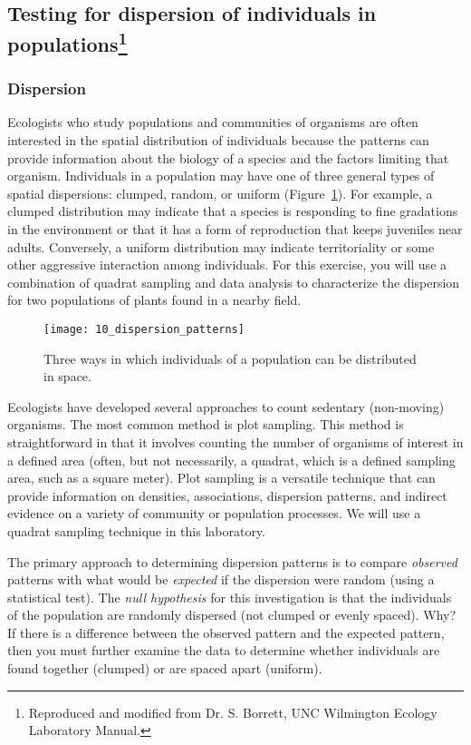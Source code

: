 \documentclass[12pt, hidelinks]{exam}
\begin{document}
\subsection*{Testing for dispersion of individuals in populations\footnote{Reproduced and modified from Dr. S. Borrett, UNC Wilmington Ecology Laboratory Manual.}}

\subsubsection*{Dispersion}

Ecologists who study populations and communities of
organisms are often interested in the spatial distribution of
individuals because the patterns can provide information
about the biology of a species and the factors limiting that
organism. Individuals in a population may have one of three general
types of spatial dispersions: clumped, random, or uniform (Figure~\ref{fig:dispersion_patterns}).
For example, a clumped distribution may indicate that a species is
responding to fine gradations in the environment or that it has a form
of reproduction that keeps juveniles near adults. Conversely, a uniform
distribution may indicate territoriality or some other aggressive
interaction among individuals. For this exercise, you will use a
combination of quadrat sampling and data analysis to characterize the
dispersion for two populations of plants found in a nearby field.

\begin{figure}[h!]
	\begin{center}
	\texttt{[image: 10\_dispersion\_patterns]}
	\caption{Three ways in which individuals of a population can be
distributed in space.}\label{fig:dispersion_patterns}
	\end{center}
\end{figure}

Ecologists have developed several approaches to count sedentary (non-moving)
 organisms. The most common method is plot sampling. This
method is straightforward in that it involves counting the number of
organisms of interest in a defined area (often, but not necessarily, a
quadrat, which is a defined sampling area, such as a square meter). 
Plot sampling is a versatile technique that can provide
information on densities, associations, dispersion patterns, and
indirect evidence on a variety of community or population processes. We
will use a quadrat sampling technique in this laboratory.

The primary approach to determining dispersion patterns is to compare
\emph{observed} patterns with what would be \emph{expected} if the
dispersion were random (using a statistical test). The \emph{null
hypothesis} for this investigation is that the individuals of the
population are randomly dispersed (not clumped or evenly spaced). Why?
If there is a difference between the observed pattern and the expected
pattern, then you must further examine the data to determine whether
individuals are found together (clumped) or are spaced apart (uniform).
\end{document}
